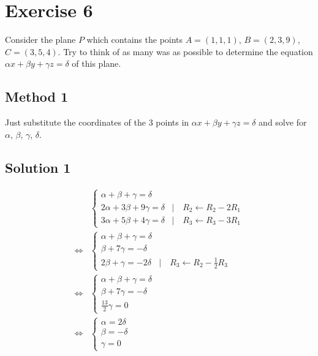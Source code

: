 \documentclass[a4paper,10pt]{article}
\begin{document}
\clearpage

\section{Exercise 6}

Consider the plane $P$ which contains the points $A = (1, 1, 1)$, $B = (2, 3, 9)$, $C = (3, 5, 4)$. Try to think of as many was as possible to determine the equation $\alpha x + \beta y + \gamma z = \delta$ of this plane.

\subsection{Method 1}
Just substitute the coordinates of the 3 points in $\alpha x + \beta y + \gamma z = \delta$ and solve for $\alpha$, $\beta$, $\gamma$, $\delta$.

\subsection{Solution 1}
\begin{align*}
     & \begin{cases}
           \alpha + \beta + \gamma = \delta                                        \\
           2\alpha + 3\beta + 9\gamma = \delta & |\quad R_2 \leftarrow R_2 - 2 R_1 \\
           3\alpha + 5\beta + 4\gamma = \delta & |\quad R_3 \leftarrow R_3 - 3 R_1
       \end{cases} \\ \iff &
    \begin{cases}
        \alpha + \beta + \gamma = \delta                                        \\
        \beta + 7\gamma = -\delta                                               \\
        2\beta + \gamma = -2\delta & |\quad R_3 \leftarrow R_2 - \frac{1}{2}R_3
    \end{cases}    \\ \iff &
    \begin{cases}
        \alpha + \beta + \gamma = \delta \\
        \beta + 7\gamma = -\delta        \\
        \frac{13}{2}\gamma = 0
    \end{cases}                                           \\ \iff &
    \begin{cases}
        \alpha = 2\delta \\
        \beta = -\delta  \\
        \gamma = 0
    \end{cases}
\end{align*}
\end{document}
